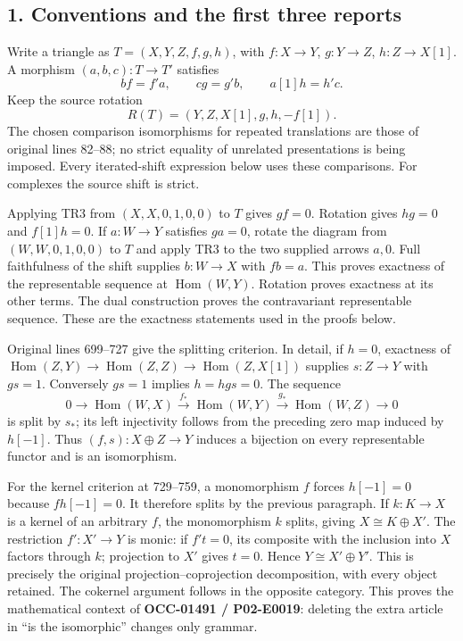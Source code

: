 \documentclass[11pt]{article}
\begin{document}
\subsection{1. Conventions and the first three reports}\label{proofs-0001-1140-conventions-and-the-first-three-reports}

Write a triangle as \(T=(X,Y,Z,f,g,h)\),\allowbreak{} with \(f:X\to Y\),\allowbreak{} \(g:Y\to Z\),\allowbreak{} \(h:Z\to X[1]\). A morphism \((a,b,c):T\to T'\) satisfies \[
bf=f'a,\qquad cg=g'b,\qquad a[1]h=h'c.
\] Keep the source rotation \[
R(T)=(Y,Z,X[1],g,h,-f[1]).
\] The chosen comparison isomorphisms for repeated translations are those of original lines 82–\allowbreak{}88; no strict equality of unrelated presentations is being imposed. Every iterated-shift expression below uses these comparisons. For complexes the source shift is strict.

Applying TR3 from \((X,X,0,1,0,0)\) to \(T\) gives \(gf=0\). Rotation gives \(hg=0\) and \(f[1]h=0\). If \(a:W\to Y\) satisfies \(ga=0\),\allowbreak{} rotate the diagram from \((W,W,0,1,0,0)\) to \(T\) and apply TR3 to the two supplied arrows \(a,0\). Full faithfulness of the shift supplies \(b:W\to X\) with \(fb=a\). This proves exactness of the representable sequence at \(\operatorname{Hom}(W,Y)\). Rotation proves exactness at its other terms. The dual construction proves the contravariant representable sequence. These are the exactness statements used in the proofs below.

Original lines 699–\allowbreak{}727 give the splitting criterion. In detail,\allowbreak{} if \(h=0\),\allowbreak{} exactness of \(\operatorname{Hom}(Z,Y)\to\operatorname{Hom}(Z,Z)
\to\operatorname{Hom}(Z,X[1])\) supplies \(s:Z\to Y\) with \(gs=1\). Conversely \(gs=1\) implies \(h=hgs=0\). The sequence \[
0\longrightarrow\operatorname{Hom}(W,X)
\xrightarrow{f_*}\operatorname{Hom}(W,Y)
\xrightarrow{g_*}\operatorname{Hom}(W,Z)\longrightarrow0
\] is split by \(s_*\); its left injectivity follows from the preceding zero map induced by \(h[-1]\). Thus \((f,s):X\oplus Z\to Y\) induces a bijection on every representable functor and is an isomorphism.

For the kernel criterion at 729–\allowbreak{}759,\allowbreak{} a monomorphism \(f\) forces \(h[-1]=0\) because \(fh[-1]=0\). It therefore splits by the previous paragraph. If \(k:K\to X\) is a kernel of an arbitrary \(f\),\allowbreak{} the monomorphism \(k\) splits,\allowbreak{} giving \(X\cong K\oplus X'\). The restriction \(f':X'\to Y\) is monic:\allowbreak{} if \(f't=0\),\allowbreak{} its composite with the inclusion into \(X\) factors through \(k\); projection to \(X'\) gives \(t=0\). Hence \(Y\cong X'\oplus Y'\). This is precisely the original projection–\allowbreak{}coprojection decomposition,\allowbreak{} with every object retained. The cokernel argument follows in the opposite category. This proves the mathematical context of \textbf{OCC-01491 /\allowbreak{} P02-E0019}:\allowbreak{} deleting the extra article in ``is the isomorphic'' changes only grammar.
\end{document}
